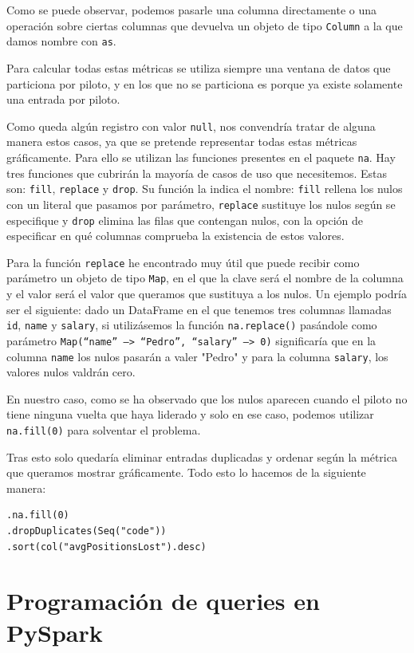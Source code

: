 \documentclass[12pt,twoside,titlepage]{report}
\newcommand{\quotes}[1]{``#1''}
\begin{document}
Como se puede observar, podemos pasarle una columna directamente o una operación sobre ciertas columnas que devuelva un objeto de tipo \texttt{Column} a la que damos nombre con \texttt{as}.

Para calcular todas estas métricas se utiliza siempre una ventana de datos que particiona por piloto, y en los que no se particiona es porque ya existe solamente una entrada por piloto.

Como queda algún registro con valor \texttt{null}, nos convendría tratar de alguna manera estos casos, ya que se pretende representar todas estas métricas gráficamente. Para ello se utilizan las funciones presentes en el paquete \texttt{na}. Hay tres funciones que cubrirán la mayoría de casos de uso que necesitemos. Estas son: \texttt{fill}, \texttt{replace} y \texttt{drop}. Su función la indica el nombre: \texttt{fill} rellena los nulos con un literal que pasamos por parámetro, \texttt{replace} sustituye los nulos según se especifique y \texttt{drop} elimina las filas que contengan nulos, con la opción de especificar en qué columnas comprueba la existencia de estos valores.

Para la función \texttt{replace} he encontrado muy útil que puede recibir como parámetro un objeto de tipo \texttt{Map}, en el que la clave será el nombre de la columna y el valor será el valor que queramos que sustituya a los nulos. Un ejemplo podría ser el siguiente: dado un DataFrame en el que tenemos tres columnas llamadas \texttt{id}, \texttt{name} y \texttt{salary}, si utilizásemos la función \texttt{na.replace()} pasándole como parámetro \texttt{Map(\quotes{name} --> \quotes{Pedro}, \quotes{salary} --> 0)} significaría que en la columna \texttt{name} los nulos pasarán a valer "Pedro" y para la columna \texttt{salary}, los valores nulos valdrán cero.

En nuestro caso, como se ha observado que los nulos aparecen cuando el piloto no tiene ninguna vuelta que haya liderado y solo en ese caso, podemos utilizar \texttt{na.fill(0)} para solventar el problema.

Tras esto solo quedaría eliminar entradas duplicadas y ordenar según la métrica que queramos mostrar gráficamente. Todo esto lo hacemos de la siguiente manera:

\begin{lstlisting}
.na.fill(0)
.dropDuplicates(Seq("code"))
.sort(col("avgPositionsLost").desc)  
\end{lstlisting}

\section{Programación de queries en PySpark}
\end{document}
